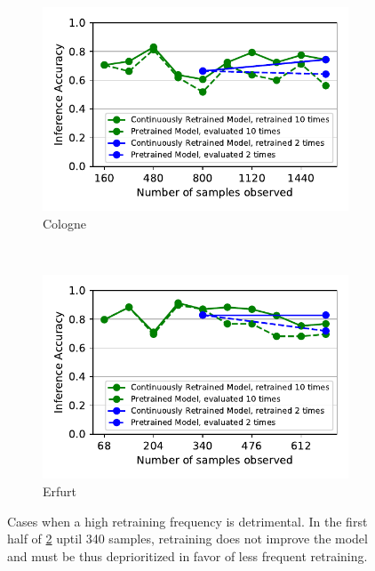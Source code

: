 \begin{figure}[t]
  \centering
  \begin{subfigure}[t]{0.5\linewidth}
    \centering
    \includegraphics[width=\linewidth]{figures/motivation/incr_learn_tasksize/motivation_tasksize_cologne.pdf}
    \caption{\small Cologne}
    \label{fig:cologne-motivation}
  \end{subfigure}  
  ~~
  \begin{subfigure}[t]{0.5\linewidth}
    \centering
    \includegraphics[width=\linewidth]{figures/motivation/incr_learn_tasksize/motivation_tasksize_erfurt.pdf}
    \caption{\small Erfurt}
    \label{fig:erfurt-motivation}
  \end{subfigure}
  \caption{Cases when a high retraining frequency is detrimental. In the first half of \ref{fig:erfurt-motivation} uptil 340 samples, retraining does not improve the model and must be thus deprioritized in favor of less frequent retraining. }
  \label{fig:cityscapes-frequency-motivation}
\end{figure}

